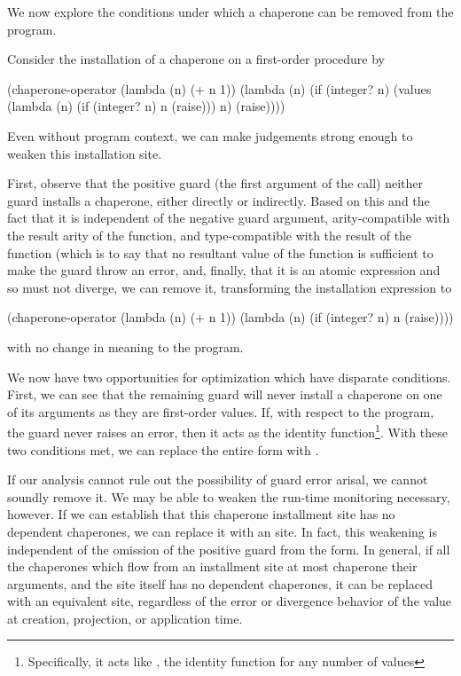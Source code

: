 \documentclass{sigplanconf}
\begin{document}
We now explore the conditions under which a chaperone can be removed from the program.

Consider the installation of a chaperone on a first-order procedure by
\begin{schemedisplay}
(chaperone-operator
 (lambda (n) (+ n 1))
 (lambda (n)
    (if (integer? n)
        (values (lambda (n)
                  (if (integer? n)
                      n
                      (raise)))
                n)
        (raise))))
\end{schemedisplay}
Even without program context, we can make judgements strong enough to weaken this installation site.

First, observe that the positive guard (the first argument of the  call) neither guard installs a chaperone, either directly or indirectly.
Based on this and the fact that it is independent of the negative guard argument, arity-compatible with the result arity of the function, and type-compatible with the result of the function (which is to say that no resultant value of the function is sufficient to make the guard throw an error, and, finally, that it is an atomic expression and so must not diverge, we can remove it, transforming the installation expression to
\begin{schemedisplay}
(chaperone-operator
 (lambda (n) (+ n 1))
 (lambda (n)
    (if (integer? n)
        n
        (raise))))
\end{schemedisplay}
with no change in meaning to the program.

We now have two opportunities for optimization which have disparate conditions.
First, we can see that the remaining guard will never install a chaperone on one of its arguments as they are first-order values.
If, with respect to the program, the guard never raises an error, then it acts as the identity function\footnote{Specifically, it acts like , the identity function for any number of values}.
With these two conditions met, we can replace the entire form with .

If our analysis cannot rule out the possibility of guard error arisal, we cannot soundly remove it.
We may be able to weaken the run-time monitoring necessary, however.
If we can establish that this chaperone installment site has no dependent chaperones, we can replace it with an  site.
In fact, this weakening is independent of the omission of the positive guard from the form.
In general, if all the chaperones which flow from an installment site at most chaperone their arguments, and the site itself has no dependent chaperones, it can be replaced with an equivalent  site, regardless of the error or divergence behavior of the value at creation, projection, or application time.
\end{document}
